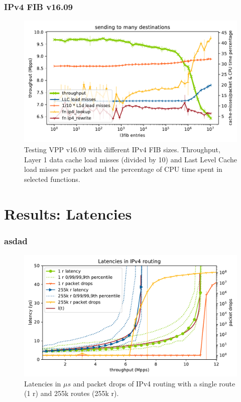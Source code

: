 \begin{frame}
    \frametitle{IPv4 FIB v16.09}
    \begin{figure}[!ht]
    \noindent\hspace{0.5mm}\includegraphics[width=\linewidth]{pics/throughput_l3_routes_klaipeda_v1609_32ghz_v3.pdf}
    \caption{Testing VPP v16.09 with different IPv4 FIB sizes. Throughput, Layer 1 data cache load misses (divided by 10) and Last Level Cache load misses per packet and the percentage of CPU time spent in selected functions. }
    \label{graph:ip4fiblegacy}
    \end{figure}
\end{frame}

\section{Results: Latencies}

\begin{frame}
    \frametitle{asdad}
    \begin{figure}[!ht]
    \noindent\hspace{0.5mm}\includegraphics[width=\linewidth]{pics/latencies_per_throughput_summary_ip4.pdf}
    \caption{Latencies in $\mu s$ and packet drops of IPv4 routing with a single route (1 r) and 255k routes (255k r). }
    \label{graph:latencyoverview}
    \end{figure}
\end{frame}

